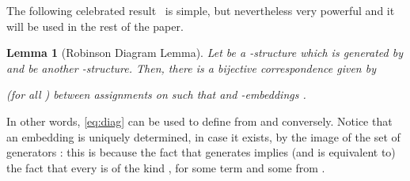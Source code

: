 \documentclass{LMCS}
\theoremstyle{plain}\newtheorem{assumption}[thm]{Assumption}
\theoremstyle{plain}\newtheorem{proposition}[thm]{Proposition}
\theoremstyle{plain}\newtheorem{property}[thm]{Property}
\theoremstyle{plain}\newtheorem{example}[thm]{Example}
\theoremstyle{plain}\newtheorem{claim}[thm]{Claim}
\theoremstyle{plain}\newtheorem{lemma}[thm]{Lemma}
\begin{document}
The following celebrated result~\cite{CK} is simple, but nevertheless
very powerful and it will be used in the rest of the paper.
\begin{lemma}[Robinson Diagram Lemma]
  \label{lem:robinson}
  Let  be a -structu\-re which is generated by
   and  be another
  -structure.  Then, there is a bijective correspondence given
  by
  
  (for all ) between assignments  on  such that
   and -embeddings
  .
\end{lemma}
In other words, \eqref{eq:diag} can be used to define  from  and conversely. Notice that an embedding  is uniquely determined, in case it exists, by the
image of the set of generators : this is because the fact that 
generates  implies (and is equivalent to) the fact that every
 is of the kind , for some term  and some
 from .
\end{document}
